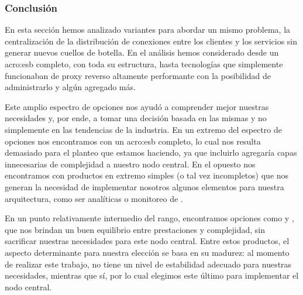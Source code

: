 \subsubsection{Conclusión}

En esta sección hemos analizado variantes para abordar un mismo problema, la centralización de la distribución de conexiones entre los clientes y los servicios sin generar nuevos cuellos de botella. En el análisis hemos considerado desde un \gls{acro:esb} completo, con toda su estructura, hasta tecnologías que simplemente funcionaban de proxy reverso altamente performante con la posibilidad de administrarlo y algún agregado más.

Este amplio espectro de opciones nos ayudó a comprender mejor nuestras necesidades y, por ende, a tomar una decisión basada en las mismas y no simplemente en las tendencias de la industria. En un extremo del espectro de opciones nos encontramos con un \gls{acro:esb} completo, lo cual nos resulta demasiado para el planteo que estamos haciendo, ya que incluirlo agregaría capas innecesarias de complejidad a nuestro nodo central. En el opuesto nos encontramos con productos en extremo simples (o tal vez incompletos) que nos generan la necesidad de implementar nosotros algunos elementos para nuestra arquitectura, como ser analíticas o monitoreo de .

En un punto relativamente intermedio del rango, encontramos opciones como  y , que nos brindan un buen equilibrio entre prestaciones y complejidad, sin sacrificar nuestras necesidades para este nodo central. Entre estos productos, el aspecto determinante para nuestra elección se basa en su madurez: al momento de realizar este trabajo,  no tiene un nivel de estabilidad adecuado para nuestras necesidades, mientras que  sí, por lo cual elegimos este último para implementar el nodo central.
